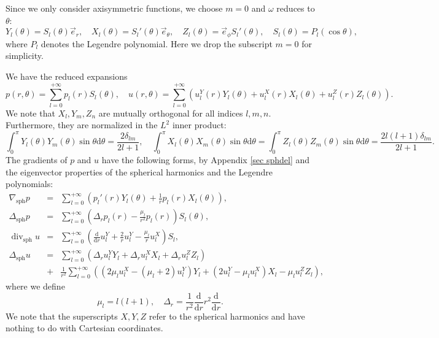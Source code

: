 \documentclass[11pt,a4paper]{article}
\numberwithin{equation}{section}
\newcommand{\mathd}{\mathrm{d}}
\newcommand{\tmop}[1]{\ensuremath{\operatorname{#1}}}
\begin{document}
Since we only consider axisymmetric functions, we choose $m = 0$ and $\omega$
reduces to $\theta$:
\begin{equation}
    \label{xyz}
 Y_l (\theta) = S_l (\theta) \vec{e}_r, \quad X_l (\theta) = S_l' (\theta)
   \vec{e}_{\theta}, \quad Z_l (\theta) = \vec{e}_{\phi} S_l' (\theta), \quad
   S_l (\theta) = P_l (\cos \theta), \end{equation}
where $P_l$ denotes the Legendre polynomial. Here we drop the subscript $m =
0$ for simplicity. 

We have the reduced expansions
$$
  p (r, \theta) = \sum_{l = 0}^{+ \infty} p_l (r) S_l (\theta),\quad
  u (r, \theta) = \sum_{l = 0}^{+ \infty} (u_l^Y (r) Y_l (\theta) + u_l^X
  (r) X_l (\theta) + u_l^Z (r) Z_l (\theta)) .
$$
We note that $X_l, Y_m, Z_n$ are mutually orthogonal for all
indices $l, m, n$. Furthermore, they are normalized in the $L^2$ inner product:
$$
  \int_0^{\pi} Y_l (\theta) Y_m (\theta) \sin \theta \mathd \theta =
  \frac{2 \delta_{l m}}{2 l + 1}, \quad
  \int_0^{\pi} X_l (\theta) X_m (\theta) \sin \theta \mathd \theta =
  \int_0^{\pi} Z_l (\theta) Z_m (\theta) \sin \theta \mathd \theta =\frac{2 l (l
  + 1)\delta_{l m}}{2 l + 1}  .
$$
The gradients of $p$ and $u$ have the following forms, by Appendix \ref{sec sphdel} and the eigenvector properties of the spherical harmonics and the Legendre polynomials:
\begin{eqnarray}
  \nabla_{\tmop{sph}} p & = & \sum_{l = 0}^{+ \infty} \left( p_l' (r) Y_l
  (\theta) + \frac{1}{r} p_l (r) X_l (\theta) \right),  \label{eq:grad p}\\
  \Delta_{\tmop{sph}} p & = & \sum_{l = 0}^{+ \infty} \left( \Delta_r p_{
  l} (r) - \frac{\mu_l}{r^2} p_{l} (r) \right) S_l (\theta),  \label{eq:lap
  p}\\
  \tmop{div}_{\tmop{sph}} u & = & \sum_{l = 0}^{+ \infty} \left(
  \frac{\mathd}{\mathd r} u_l^Y + \frac{2}{r} u_l^Y - \frac{\mu_l}{r} u_l^X
  \right) S_l,  \label{eq:div u}\\
  \Delta_{\tmop{sph}} u & = & \sum_{l = 0}^{+ \infty} (\Delta_r u_l^Y Y_l +
  \Delta_r u_l^X X_l + \Delta_r u_l^Z Z_l) \nonumber\\
  & + & \frac{1}{r^2} \sum_{l = 0}^{+ \infty} ((2 \mu_l u_l^X - (\mu_l + 2)
  u_l^Y) Y_l + (2 u_l^Y - \mu_l u_l^X) X_l - \mu_l u_l^Z Z_l),  \label{eq:lap
  u}
\end{eqnarray}
where we define
$$
  \mu_l = l (l + 1),\quad
  \Delta_r = \frac{1}{r^2} \frac{\mathd}{\mathd r} r^2
  \frac{\mathd}{\mathd r} .
$$
 We note that the superscripts $X,Y,Z$ refer to the spherical harmonics and have nothing to do with Cartesian coordinates.
\end{document}
